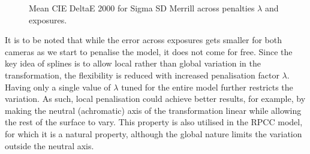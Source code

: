 \begin{figure}
    \centering
    \caption{Mean CIE DeltaE 2000 for Sigma SD Merrill across penalties $\lambda$ and exposures.}
    \label{fig:sigmaexposure}
\end{figure}

It is to be noted that while the error across exposures gets smaller for both cameras as we start to penalise the model, it does not come for free. Since the key idea of splines is to allow local rather than global variation in the transformation, the flexibility is reduced with increased penalisation factor $\lambda$. Having only a single value of $\lambda$ tuned for the entire model further restricts the variation. As such, local penalisation could achieve better results, for example, by making the neutral (achromatic) axis of the transformation linear while allowing the rest of the surface to vary. This property is also utilised in the RPCC model, for which it is a natural property, although the global nature limits the variation outside the neutral axis.